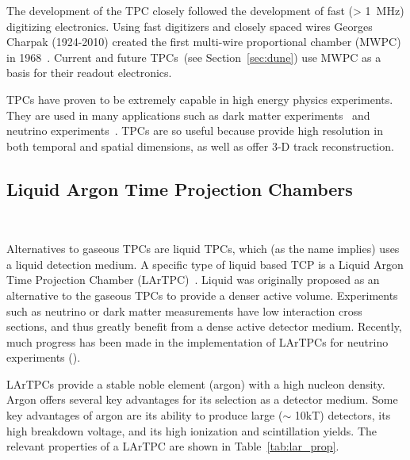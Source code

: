 The development of the TPC closely followed the development of fast (> 1~\unit{MHz}) digitizing electronics.
Using fast digitizers and closely spaced wires Georges Charpak (1924-2010) created the first multi-wire proportional chamber (MWPC) in 1968~\citep{Charpak:1968kd}.
Current and future TPCs~(see Section~\ref{sec:dune}) use MWPC as a basis for their readout electronics.

TPCs have proven to be extremely capable in high energy physics experiments.
They are used in many applications such as dark matter experiments~\citep{Aprile_2017_xenon1T} and neutrino experiments~\citep{MicroBooNE_Acciarri_2017}.
TPCs are so useful because provide high resolution in both temporal and spatial dimensions, as well as offer 3-D track reconstruction.


\subsection{Liquid Argon Time Projection Chambers}~\label{sec:lartpcs}

Alternatives to gaseous TPCs are liquid TPCs, which (as the name implies) uses a liquid detection medium.
A specific type of liquid based TCP is a Liquid Argon Time Projection Chamber (LArTPC)~\citep{rubbia1977liquid}.
Liquid was originally proposed as an alternative to the gaseous TPCs to provide a denser active volume.
Experiments such as neutrino or dark matter measurements have low interaction cross sections, and thus greatly benefit from a dense active detector medium.
Recently, much progress has been made in the implementation of LArTPCs for neutrino experiments (\citep{ArgoNeuT_PhysRevD.99.012002, MicroBooNE_Acciarri_2017, LArIAT_Acciarri_2020}).

LArTPCs provide a stable noble element (argon) with a high nucleon density.
Argon offers several key advantages for its selection as a detector medium.
Some key advantages of argon are its ability to produce large ($\sim$ 10kT) detectors, its high breakdown voltage, and its high ionization and scintillation yields.
The relevant properties of a LArTPC are shown in Table~\ref{tab:lar_prop}.

